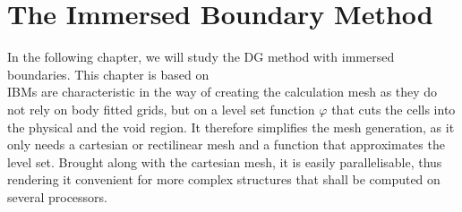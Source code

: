 \chapter{The Immersed Boundary Method}
\label{immersedBoundaries}
In the following chapter, we will study the DG method with immersed boundaries. This chapter is based on \textcite{paper} \\ \indent 
IBMs are characteristic in the way of creating the calculation mesh as they do not rely on body fitted grids, but on a level set function $\varphi$ that cuts the cells into the physical and the void region. It therefore simplifies the mesh generation, as it only needs a cartesian or rectilinear mesh and a function that approximates the level set. Brought along with the cartesian mesh, it is easily parallelisable, thus rendering it convenient for more complex structures that shall be computed on several processors.
